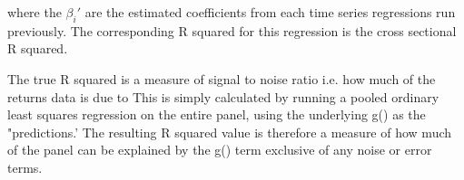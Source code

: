 \documentclass[a4paper, table]{article}
\begin{document}
where the $\beta_i'$ are the estimated coefficients from each time series regressions run previously. The corresponding R squared for this regression is the cross sectional R squared.

The true R squared is a measure of signal to noise ratio i.e. how much of the returns data is due to 
This is simply calculated by running a pooled ordinary least squares regression on the entire panel, using the underlying g() as the "predictions.' The resulting R squared value is therefore a measure of how much of the panel can be explained by the g() term exclusive of any noise or error terms.




\end{document}
